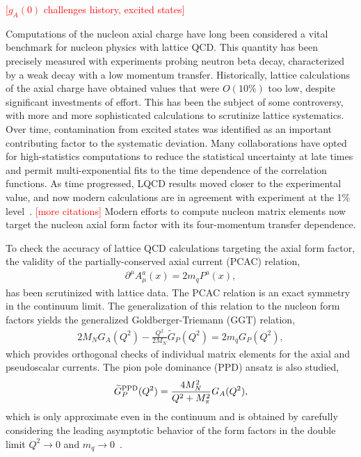 
\textcolor{red}{[$g_A(0)$ challenges history, excited states]}

Computations of the nucleon axial charge have long been considered
 a vital benchmark for nucleon physics with lattice QCD.
This quantity has been precisely measured with experiments probing neutron beta decay,
 characterized by a weak decay with a low momentum transfer.
Historically, lattice calculations of the axial charge have obtained values
 that were $O(10\%)$ too low, despite significant investments of effort.
This has been the subject of some controversy,
 with more and more sophisticated calculations to scrutinize lattice systematics.
Over time, contamination from excited states was identified as
 an important contributing factor to the systematic deviation.
Many collaborations have opted for high-statistics computations
 to reduce the statistical uncertainty at late times and permit
 multi-exponential fits to the time dependence of the correlation functions.
As time progressed, LQCD results moved closer to the experimental value,
 and now modern calculations are in agreement with experiment
 at the 1\% level~\cite{Kronfeld:2019nfb}.
\textcolor{red}{[more citations]}
Modern efforts to compute nucleon matrix elements now target the nucleon
 axial form factor with its four-momentum transfer dependence.

To check the accuracy of lattice QCD calculations targeting the axial form factor,
 the validity of the partially-conserved axial current (PCAC) relation,
\begin{align}
 \partial^\mu A^{a}_{\mu}(x) = 2 m_q P^{a}(x),
 \label{eq:pcac}
\end{align}
 has been scrutinized with lattice data.
The PCAC relation is an exact symmetry in the continuum limit.
The generalization of this relation to the nucleon form factors
 yields the generalized Goldberger-Triemann (GGT) relation,
\begin{align}
 2 M_N G_A(Q^2) -\frac{Q^2}{2M_N} \widetilde{G}_P(Q^2) = 2 m_q G_{P}(Q^2),
 \label{eq:ggt}
\end{align}
 which provides orthogonal checks of individual matrix elements
 for the axial and pseudoscalar currents.
The pion pole dominance (PPD) ansatz is also studied,
\begin{align}
 \widetilde{G}^{\rm PPD}_P(Q^2) = \frac{4M_N^2}{Q^2+M_\pi^2} G_A(Q^2),
 \label{eq:ppd}
\end{align}
 which is only approximate even in the continuum and is obtained
 by carefully considering the leading asymptotic behavior of the
 form factors in the double limit $Q^2\to0$ and $m_q\to0$~\cite{Sasaki:2007gw}.

